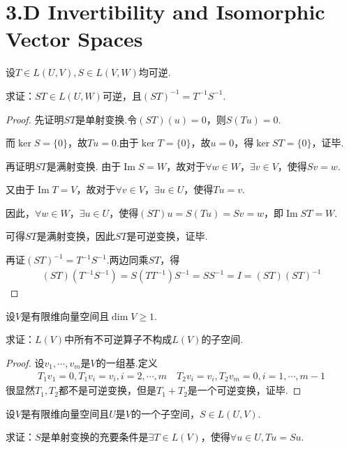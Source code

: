 \section{3.D Invertibility and Isomorphic Vector Spaces}

\begin{problem}[1]\label{3.D.1}
    设\(T \in L(U,V),S \in L(V,W)\)均可逆.

    求证：\(ST \in L(U,W)\)可逆，且\((ST)^{-1}=T^{-1}S^{-1}\).
\end{problem}

\begin{proof}
    先证明\(ST\)是单射变换.令\((ST)(u)=0\)，则\(S(Tu)=0\).

    而\(\ker S=\{0\}\)，故\(Tu=0\).由于\(\ker T=\{0\}\)，故\(u=0\)，得\(\ker ST=\{0\}\)，证毕.
    
    再证明\(ST\)是满射变换.
    由于\(\operatorname{Im} S=W\)，故对于\(\forall w \in W\)，\(\exists v \in V\)，使得\(Sv=w\).
    
    又由于\(\operatorname{Im} T=V\)，故对于\(\forall v \in V\)，\(\exists u \in U\)，使得\(Tu=v\).
    
    因此，\(\forall w \in W\)，\(\exists u \in U\)，使得\((ST)u=S(Tu)=Sv=w\)，即\(\operatorname{Im} ST=W\).
    
    可得\(ST\)是满射变换，因此\(ST\)是可逆变换，证毕.
    
    再证\((ST)^{-1}=T^{-1}S^{-1}\).两边同乘\(ST\)，得
    \begin{align*}
        (ST)(T^{-1}S^{-1})=S(TT^{-1})S^{-1}=SS^{-1}=I=(ST)(ST)^{-1} 
    \end{align*}
\end{proof}

\begin{problem}[2]\label{3.D.2}
    设\(V\)是有限维向量空间且\(\dim V \geq 1\).
    
    求证：\(L(V)\)中所有不可逆算子不构成\(L(V)\)的子空间.    
\end{problem}

\begin{proof}
    设\(v_1,\cdots,v_m\)是\(V\)的一组基.定义
    \begin{align*}
        T_1v_1=0,T_1v_i=v_i,i=2,\cdots,m \quad
        T_2v_i=v_i,T_2v_m=0,i=1,\cdots,m-1
    \end{align*}
    很显然\(T_1,T_2\)都不是可逆变换，但是\(T_1+T_2\)是一个可逆变换，证毕.    
\end{proof}

\begin{problem}[3]\label{3.D.3}
    设\(V\)是有限维向量空间且\(U\)是\(V\)的一个子空间，\(S \in L(U,V)\).

    求证：\(S\)是单射变换的充要条件是\(\exists T \in L(V)\)，使得\(\forall u \in U,Tu=Su\).        
\end{problem}

